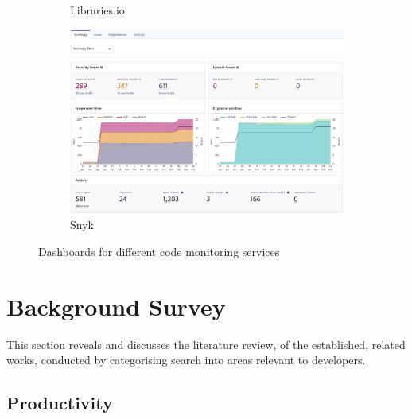 \documentclass{mprop}
\begin{document}
\begin{figure}[h]
\begin{subfigure}[b]{0.475\textwidth}
        \caption[]%
        {{\small Libraries.io}}
    \end{subfigure}
    \hfill
    \begin{subfigure}[b]{0.475\textwidth}   
        \centering 
        \includegraphics[width=\textwidth]{snyk_dashboard.png}
        \caption[]%
        {{\small Snyk}}
    \end{subfigure}
    \caption[]
    {\small Dashboards for different code monitoring services} 
\end{figure}

\newpage
\section{Background Survey}


This section reveals and discusses the literature review, of the established, related works, conducted by categorising search into areas relevant to developers.

\subsection{Productivity}
\end{document}
